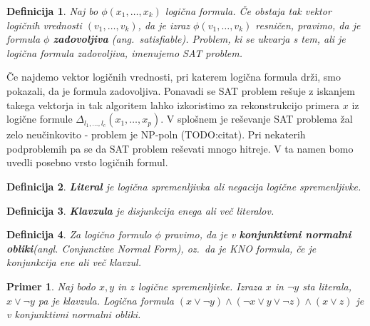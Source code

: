 \documentclass[12pt,a4paper]{article}
\newtheorem{definicija}{Definicija}
\newtheorem{primer}{Primer}
\begin{document}
\begin{definicija}
	Naj bo $\phi(x_1,\ldots,x_k)$ logična formula.
	Če obstaja tak vektor logičnih vrednosti $(v_1, \ldots, v_k)$, da je izraz $\phi(v_1, \ldots, v_k)$ resničen,
	pravimo, da je formula $\phi$ \textbf{zadovoljiva} (ang.~satisfiable).
	Problem, ki se ukvarja s tem, ali je logična formula zadovoljiva, imenujemo SAT problem. %
\end{definicija}
Če najdemo vektor logičnih vrednosti, pri katerem logična formula drži, smo pokazali, da je formula zadovoljiva.
Ponavadi se SAT problem rešuje z iskanjem takega vektorja in tak algoritem lahko izkoristimo za rekonstrukcijo primera $x$ iz logične formule $\Delta_{l_1,\ldots,l_c}(x_1,\ldots,x_p)$.
V splošnem je reševanje SAT problema žal zelo neučinkovito - problem je NP-poln (TODO:citat).
Pri nekaterih podproblemih pa se da SAT problem reševati mnogo hitreje. 
V ta namen bomo uvedli posebno vrsto logičnih formul.

\begin{definicija}
	\textbf{Literal} je logična spremenljivka ali negacija logične spremenljivke.
\end{definicija}

\begin{definicija}
	\textbf{Klavzula} je disjunkcija enega ali več literalov.
\end{definicija}

\begin{definicija}
	Za logično formulo $\phi$ pravimo, da je v \textbf{konjunktivni normalni obliki}(angl. Conjunctive Normal Form), 
	oz.~da je KNO formula, če je konjunkcija ene ali več klavzul.
\end{definicija}

\begin{primer}
	Naj bodo $x,y$ in $z$ logične spremenljivke. Izraza $x$ in $\lnot y$ sta literala, $x \lor \lnot y$ pa je klavzula.
	Logična formula $(x \lor \lnot y) \land (\lnot x \lor y \lor \lnot z) \land (x \lor z)$ je v konjunktivni normalni obliki.
\end{primer}
\end{document}
